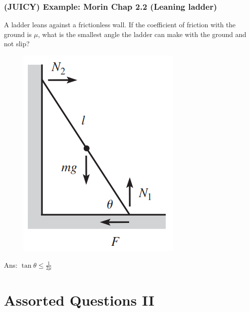 \documentclass{article}
\begin{document}
\subsubsection{(JUICY) Example: Morin Chap 2.2 (Leaning ladder)}
A ladder leans against a frictionless wall. If the coefficient of friction with the ground is $\mu$, what is the smallest angle the ladder can make with the ground and not slip?\\
\begin{figure} 
\includegraphics[width=\linewidth]{images/morinleaningladder.png}
\label{fig:morinleaningladder}
\end{figure}
Ans: $\tan \theta \leq \frac{1}{2\mu}$
\clearpage 
\section{Assorted Questions II}
\end{document}
